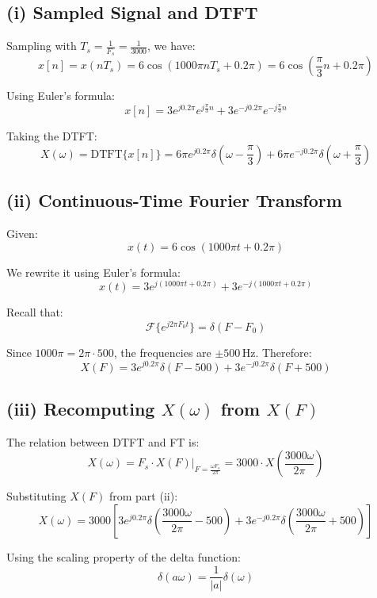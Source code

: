 \documentclass[12pt]{article}
\begin{document}
    \subsection*{(i) Sampled Signal and DTFT}
    
    Sampling with \( T_s = \frac{1}{F_s} = \frac{1}{3000} \), we have:
    \[
    x[n] = x(nT_s) = 6 \cos(1000\pi n T_s + 0.2\pi) = 6 \cos\left(\frac{\pi}{3} n + 0.2\pi\right)
    \]
    
    Using Euler’s formula:
    \[
    x[n] = 3 e^{j0.2\pi} e^{j\frac{\pi}{3} n} + 3 e^{-j0.2\pi} e^{-j\frac{\pi}{3} n}
    \]
    
    Taking the DTFT:
    \[
    X(\omega) = \text{DTFT}\{x[n]\} = 6\pi e^{j0.2\pi} \delta\left(\omega - \frac{\pi}{3}\right) + 6\pi e^{-j0.2\pi} \delta\left(\omega + \frac{\pi}{3}\right)
    \]
    
    \subsection*{(ii) Continuous-Time Fourier Transform}
    
    Given:
    \[
    x(t) = 6 \cos(1000\pi t + 0.2\pi)
    \]
    
    We rewrite it using Euler's formula:
    \[
    x(t) = 3 e^{j(1000\pi t + 0.2\pi)} + 3 e^{-j(1000\pi t + 0.2\pi)}
    \]
    
    Recall that:
    \[
    \mathcal{F}\{e^{j2\pi F_0 t}\} = \delta(F - F_0)
    \]
    
    Since \( 1000\pi = 2\pi \cdot 500 \), the frequencies are \( \pm500 \, \text{Hz} \). Therefore:
    \[
    X(F) = 3 e^{j0.2\pi} \delta(F - 500) + 3 e^{-j0.2\pi} \delta(F + 500)
    \]
    
    \subsection*{(iii) Recomputing \( X(\omega) \) from \( X(F) \)}
    
    The relation between DTFT and FT is:
    \[
    X(\omega) = F_s \cdot X(F) \bigg|_{F = \frac{\omega F_s}{2\pi}} = 3000 \cdot X\left(\frac{3000 \omega}{2\pi}\right)
    \]
    
    Substituting \( X(F) \) from part (ii):
    \[
    X(\omega) = 3000 \left[3 e^{j0.2\pi} \delta\left(\frac{3000 \omega}{2\pi} - 500\right) + 3 e^{-j0.2\pi} \delta\left(\frac{3000 \omega}{2\pi} + 500\right)\right]
    \]
    
    Using the scaling property of the delta function:
    \[
    \delta\left(a\omega\right) = \frac{1}{|a|} \delta(\omega)
    \]
    
\end{document}
